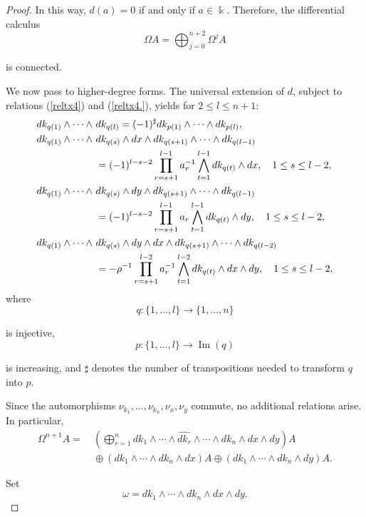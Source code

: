 \documentclass{amsart}
\theoremstyle{definition}
\theoremstyle{remark}
\numberwithin{equation}{section}
\begin{document}
\begin{proof}
In this way, $d(a) = 0$ if and only if $a\in \Bbbk$. Therefore, the differential calculus
\[
\Omega A=\bigoplus_{j=0}^{n+2}\Omega^jA
\]

is connected.

We now pass to higher-degree forms. The universal extension of $d$, subject to relations
{\rm(}\ref{reltx4}{\rm)} and {\rm(}\ref{reltx4.}{\rm)}, yields for $2\leq l\leq n+1$:
\begin{align} 
dk_{q(1)}\wedge \dotsb \wedge &\ dk_{q(l)} = (-1)^{\sharp}dk_{p(1)}\wedge \dotsb \wedge dk_{p(l)},\label{relasins1s2n1} \\ dk_{q(1)}\wedge \dotsb \wedge &\ dk_{q(s)}\wedge dx \wedge dk_{q(s+1)}\wedge \dotsb \wedge dk_{q(l-1)} \notag \\ &\ = (-1)^{l-s-2}\prod_{r=s+1}^{l-1} a_{r}^{-1} \bigwedge_{t=1}^{l-1}dk_{q(t)}\wedge dx, \quad 1\leq s \leq l-2, \label{relasins1s2n2} \\ dk_{q(1)}\wedge \dotsb \wedge &\ dk_{q(s)}\wedge dy \wedge dk_{q(s+1)}\wedge \dotsb \wedge dk_{q(l-1)} \notag \\ &\ = (-1)^{l-s-2}\prod_{r=s+1}^{l-1} a_r \bigwedge_{t=1}^{l-1}dk_{q(t)}\wedge dy, \quad 1\leq s \leq l-2, \label{relasins1s2n22} \\ dk_{q(1)}\wedge \dotsb \wedge &\ dk_{q(s)}\wedge dy\wedge dx \wedge dk_{q(s+1)} \wedge \dotsb \wedge dk_{q(l-2)} \notag \\ &\ = -\rho^{-1}\prod_{r=s+1}^{l-2} a_{r}^{-1}\bigwedge_{t=1}^{l-2}dk_{q(t)}\wedge dx \wedge dy, \quad 1\leq s \leq l-2,\label{relasins1s2n3} 
\end{align}
where
\[
q:\{1,\ldots,l\}\to \{1,\ldots,n\}
\]

is injective,
\[
p:\{1,\ldots,l\}\to \operatorname{Im}(q)
\]

is increasing, and $\sharp$ denotes the number of transpositions needed to transform $q$ into $p$.

Since the automorphisms $\nu_{k_1},\ldots,\nu_{k_n},\nu_x,\nu_y$ commute, no additional relations arise. In particular,
\begin{align*}
\Omega^{n+1}A = &\ \left(\bigoplus_{r=1}^{n}dk_1\wedge\cdots\wedge \widehat{dk_r}\wedge\cdots\wedge dk_n\wedge dx\wedge dy\right)A \\
&\ \oplus (dk_1\wedge\cdots\wedge dk_n\wedge dx)A\oplus(dk_1\wedge\cdots\wedge dk_n\wedge dy)A.
\end{align*}

Set
\[
\omega=dk_1\wedge\cdots\wedge dk_n\wedge dx\wedge dy.
\]


\end{proof}
\end{document}
